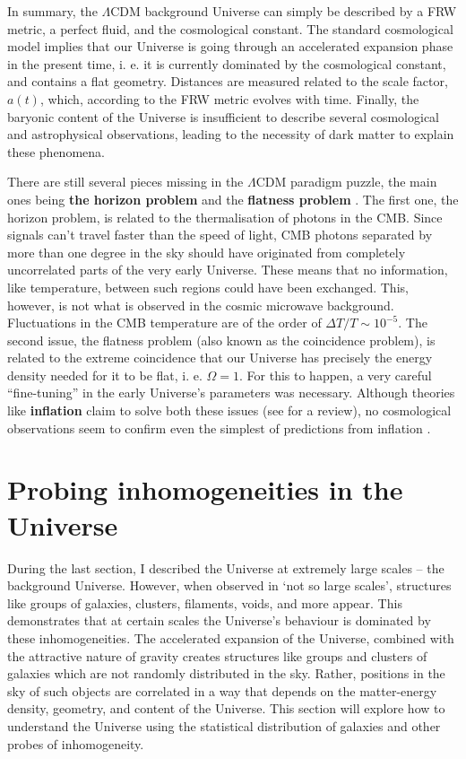\qquad In summary, the $\Lambda$CDM background Universe can simply be described by a FRW metric, a perfect fluid, and the cosmological constant. The standard cosmological model implies that our Universe is going through an accelerated expansion phase in the present time, i. e. it is currently dominated by the cosmological constant, and contains a flat geometry. Distances are measured related to the scale factor, $a(t)$, which, according to the FRW metric evolves with time. Finally, the baryonic content of the Universe is insufficient to describe several cosmological and astrophysical observations, leading to the necessity of dark matter to explain these phenomena. 

\qquad There are still several pieces missing in the $\Lambda$CDM paradigm puzzle, the main ones being \textbf{the horizon problem} and the \textbf{flatness problem} \citep{schneider_2016}. The first one, the horizon problem, is related to the thermalisation of photons in the CMB. Since signals can't travel faster than the speed of light, CMB photons separated by more than one degree in the sky should have originated from completely uncorrelated parts of the very early Universe. These means that no information, like temperature, between such regions could have been exchanged. This, however, is not what is observed in the cosmic microwave background. Fluctuations in the CMB temperature are of the order of $\Delta T/T \sim 10^{-5}$. The second issue, the flatness problem (also known as the coincidence problem), is related to the extreme coincidence that our Universe has precisely the energy density needed for it to be flat, i. e. $\Omega = 1$. For this to happen, a very careful ``fine-tuning'' in the early Universe's parameters was necessary. Although theories like \textbf{inflation} claim to solve both these issues (see \citealt{2008InflationReview} for a review), no cosmological observations seem to confirm even the simplest of predictions from inflation \citep{2014Bicep2Planck}.

\vspace{10mm}
\section{Probing inhomogeneities in the Universe}
During the last section, I described the Universe at extremely large scales -- the background Universe. However, when observed in `not so large scales', structures like groups of galaxies, clusters, filaments, voids, and more appear. This demonstrates that at certain scales the Universe's behaviour is dominated by these inhomogeneities. The accelerated expansion of the Universe, combined with the attractive nature of gravity creates structures like groups and clusters of galaxies which are not randomly distributed in the sky. Rather, positions in the sky of such objects are correlated in a way that depends on the matter-energy density, geometry, and content of the Universe. This section will explore how to understand the Universe using the statistical distribution of galaxies and other probes of inhomogeneity.

